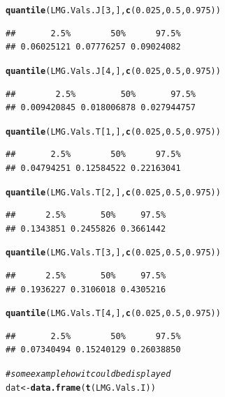\documentclass[11pt,a4paper,twoside]{book}
\makeatletter
\newcommand{\hlnum}[1]{\textcolor[rgb]{0.686,0.059,0.569}{#1}}%
\newcommand{\hlcom}[1]{\textcolor[rgb]{0.678,0.584,0.686}{\textit{#1}}}%
\newcommand{\hlstd}[1]{\textcolor[rgb]{0.345,0.345,0.345}{#1}}%
\newcommand{\hlkwb}[1]{\textcolor[rgb]{0.69,0.353,0.396}{#1}}%
\newcommand{\hlkwd}[1]{\textcolor[rgb]{0.737,0.353,0.396}{\textbf{#1}}}%
\newenvironment{kframe}{%
 \def\at@end@of@kframe{}%
 \ifinner\ifhmode%
  \def\at@end@of@kframe{\end{minipage}}%
  \begin{minipage}{\columnwidth}%
 \fi\fi%
 \def\FrameCommand##1{\hskip\@totalleftmargin \hskip-\fboxsep
 \colorbox{shadecolor}{##1}\hskip-\fboxsep
     \hskip-\linewidth \hskip-\@totalleftmargin \hskip\columnwidth}%
 \MakeFramed {\advance\hsize-\width
   \@totalleftmargin\z@ \linewidth\hsize
   \@setminipage}}%
 {\par\unskip\endMakeFramed%
 \at@end@of@kframe}
\newenvironment{knitrout}{}{} %
\makeatother
\begin{document}
\begin{knitrout}
\begin{kframe}
\begin{alltt}
\hlkwd{quantile}\hlstd{(LMG.Vals.J[}\hlnum{3}\hlstd{,],} \hlkwd{c}\hlstd{(}\hlnum{0.025}\hlstd{,} \hlnum{0.5}\hlstd{,} \hlnum{0.975}\hlstd{))}
\end{alltt}
\begin{verbatim}
##       2.5%        50%      97.5% 
## 0.06025121 0.07776257 0.09024082
\end{verbatim}
\begin{alltt}
\hlkwd{quantile}\hlstd{(LMG.Vals.J[}\hlnum{4}\hlstd{,],} \hlkwd{c}\hlstd{(}\hlnum{0.025}\hlstd{,} \hlnum{0.5}\hlstd{,} \hlnum{0.975}\hlstd{))}
\end{alltt}
\begin{verbatim}
##        2.5%         50%       97.5% 
## 0.009420845 0.018006878 0.027944757
\end{verbatim}
\begin{alltt}
\hlkwd{quantile}\hlstd{(LMG.Vals.T[}\hlnum{1}\hlstd{,],} \hlkwd{c}\hlstd{(}\hlnum{0.025}\hlstd{,} \hlnum{0.5}\hlstd{,} \hlnum{0.975}\hlstd{))}
\end{alltt}
\begin{verbatim}
##       2.5%        50%      97.5% 
## 0.04794251 0.12584522 0.22163041
\end{verbatim}
\begin{alltt}
\hlkwd{quantile}\hlstd{(LMG.Vals.T[}\hlnum{2}\hlstd{,],} \hlkwd{c}\hlstd{(}\hlnum{0.025}\hlstd{,} \hlnum{0.5}\hlstd{,} \hlnum{0.975}\hlstd{))}
\end{alltt}
\begin{verbatim}
##      2.5%       50%     97.5% 
## 0.1343851 0.2455826 0.3661442
\end{verbatim}
\begin{alltt}
\hlkwd{quantile}\hlstd{(LMG.Vals.T[}\hlnum{3}\hlstd{,],} \hlkwd{c}\hlstd{(}\hlnum{0.025}\hlstd{,} \hlnum{0.5}\hlstd{,} \hlnum{0.975}\hlstd{))}
\end{alltt}
\begin{verbatim}
##      2.5%       50%     97.5% 
## 0.1936227 0.3106018 0.4305216
\end{verbatim}
\begin{alltt}
\hlkwd{quantile}\hlstd{(LMG.Vals.T[}\hlnum{4}\hlstd{,],} \hlkwd{c}\hlstd{(}\hlnum{0.025}\hlstd{,} \hlnum{0.5}\hlstd{,} \hlnum{0.975}\hlstd{))}
\end{alltt}
\begin{verbatim}
##       2.5%        50%      97.5% 
## 0.07340494 0.15240129 0.26038850
\end{verbatim}
\begin{alltt}
\hlcom{# some example how it could be displayed}
\hlstd{dat} \hlkwb{<-} \hlkwd{data.frame}\hlstd{(}\hlkwd{t}\hlstd{(LMG.Vals.I))}


\end{alltt}
\end{kframe}
\end{knitrout}
\end{document}
